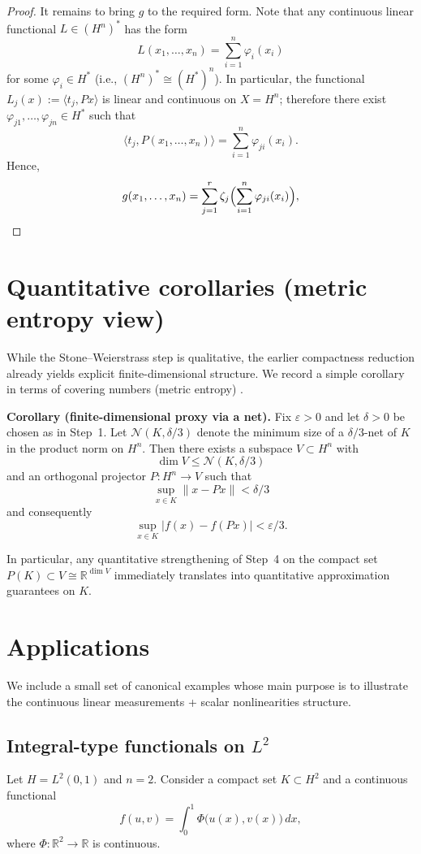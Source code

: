 \documentclass[final,12pt]{colt2026} %
\begin{document}
\begin{proof}
It remains to bring $g$ to the required form.
Note that any continuous linear functional $L\in (H^n)^*$ has the form \cite{kreyszig_fa}
\[
  L(x_1,\dots,x_n)=\sum_{i=1}^n \varphi_i(x_i)
\]
for some $\varphi_i\in H^*$ (i.e., $(H^n)^*\cong (H^*)^n$). In particular, the functional
\(
L_j(x):=\langle t_j,Px\rangle
\)
is linear and continuous on $X=H^n$; therefore there exist $\varphi_{j1},\dots,\varphi_{jn}\in H^*$ such that
\[
  \langle t_j,P(x_1,\dots,x_n)\rangle=\sum_{i=1}^n \varphi_{ji}(x_i).
\]
Hence,
\[
  g(x_1,\dots,x_n)=\sum_{j=1}^r \zeta_j\Bigl(\sum_{i=1}^n \varphi_{ji}(x_i)\Bigr),
\]
\end{proof}

\section{Quantitative corollaries (metric entropy view)}
While the Stone--Weierstrass step is qualitative, the earlier compactness reduction already yields explicit finite-dimensional structure. We record a simple corollary in terms of covering numbers (metric entropy) \cite{kolmogorov_tikhomirov_entropy}.

\textbf{Corollary (finite-dimensional proxy via a net).} Fix $\varepsilon>0$ and let $\delta>0$ be chosen as in Step~1. Let $\mathcal{N}(K,\delta/3)$ denote the minimum size of a $\delta/3$-net of $K$ in the product norm on $H^n$. Then there exists a subspace $V\subset H^n$ with
\[
  \dim V\le \mathcal{N}(K,\delta/3)
\]
and an orthogonal projector $P\colon H^n\to V$ such that
\[
  \sup_{x\in K}\|x-Px\|<\delta/3
\]
and consequently
\[
  \sup_{x\in K}|f(x)-f(Px)|<\varepsilon/3.
\]

In particular, any quantitative strengthening of Step~4 on the compact set $P(K)\subset V\cong \mathbb{R}^{\dim V}$ immediately translates into quantitative approximation guarantees on $K$.

\section{Applications}
We include a small set of canonical examples whose main purpose is to illustrate the continuous linear measurements + scalar nonlinearities structure.

\subsection{Integral-type functionals on $L^2$}
Let $H=L^2(0,1)$ and $n=2$. Consider a compact set $K\subset H^2$ and a continuous functional
\[
  f(u,v)=\int_0^1 \Phi\bigl(u(x),v(x)\bigr)\,dx,
\]
where $\Phi\colon\mathbb{R}^2\to\mathbb{R}$ is continuous.
\end{document}
